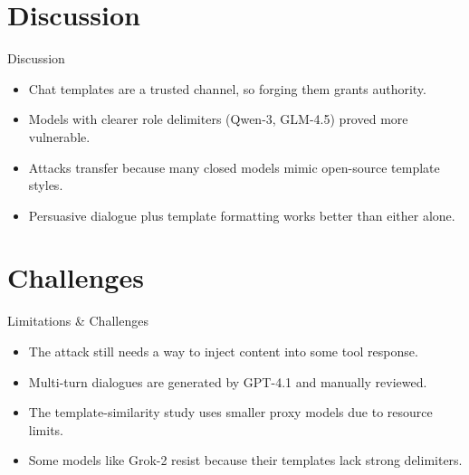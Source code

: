 \documentclass[10pt]{beamer}
\begin{document}
\section{Discussion}
\begin{frame}{Discussion}
\begin{itemize}
  \item Chat templates are a trusted channel, so forging them grants authority.
  \item Models with clearer role delimiters (Qwen-3, GLM-4.5) proved more vulnerable.
  \item Attacks transfer because many closed models mimic open-source template styles.
  \item Persuasive dialogue plus template formatting works better than either alone.
\end{itemize}
\end{frame}
\section{Challenges}
\begin{frame}{Limitations \& Challenges}
\begin{itemize}
  \item The attack still needs a way to inject content into some tool response.
  \item Multi-turn dialogues are generated by GPT-4.1 and manually reviewed.
  \item The template-similarity study uses smaller proxy models due to resource limits.
  \item Some models like Grok-2 resist because their templates lack strong delimiters.
\end{itemize}
\end{frame}
\end{document}
